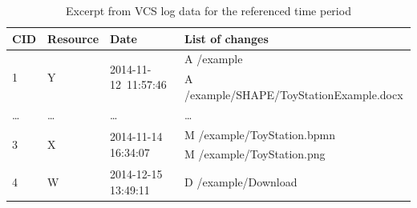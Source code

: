 \begin{table}[bt]
\caption{Excerpt from VCS log data for the referenced time period }
\label{tab:bpm2015example}
{
\centering
\begin{tabular}{m{.8cm} m{1.5cm} m{3cm} p{5.8cm}}
\toprule
\textbf{CID}	 & \textbf{Resource} & \textbf{Date} & \textbf{List of changes} \\
\midrule
\multirow{2}{*}{1} & \multirow{2}{*}{Y} & \multirow{2}{*}{2014-11-12~11:57:46} & A /example \\
& & & A \slash example\slash SHAPE\slash\-ToyStation\-Example.docx \\ \hline %


\ldots & \ldots & \ldots & \ldots \\ \hline

\multirow{2}{*}{3} & \multirow{2}{*}{X} & \multirow{2}{*}{2014-11-14 16:34:07} & M /example/ToyStation.bpmn\\
& & & M /example/ToyStation.png \\ \hline %



4 & W & 2014-12-15 13:49:11 & D /example/Download \\ \hline %


\end{tabular}}
\end{table}
